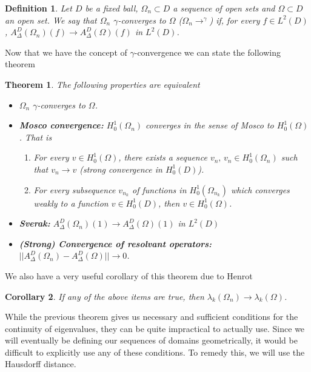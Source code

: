 \documentclass[12pt]{report}
\newtheorem{theorem}{Theorem}[section]
\newtheorem{corollary}[theorem]{Corollary}
\newtheorem{definition}{Definition}
\numberwithin{definition}{section}
\begin{document}
\begin{definition}
  Let $D$ be a fixed ball, $\Omega_{n} \subset D$ a sequence of open sets and $\Omega \subset D$ an open set.
  We say that $\Omega_{n}$ $\gamma$-converges to $\Omega$ ($\Omega_{n} \to^{\gamma}$) if, for every $f \in L^{2}(D)$, $A_{\Delta}^{D}(\Omega_{n})(f) \to A_{\Delta}^{D}(\Omega)(f)$ in $L^{2}(D)$.
\end{definition}

Now that we have the concept of $\gamma$-convergence we can state the following theorem\cite{convergence}

\begin{theorem}
  The following properties are equivalent
  \begin{itemize}
    \item $\Omega_{n}$ $\gamma$-converges to $\Omega$.
    \item \textbf{Mosco convergence:} $H_{0}^{1}(\Omega_{n})$ converges in the sense of Mosco to $H_{0}^{1}(\Omega)$.
      That is
      \begin{enumerate}
        \item[(M1)] For every $v \in H_{0}^{1}(\Omega)$, there exists a sequence $v_{n}, \, v_{n} \in H_{0}^{1}(\Omega_{n})$ such that $v_{n} \to v$ (strong convergence in $H_{0}^{1}(D)$).
        \item[(M2)] For every subsequence $v_{n_{k}}$ of functions in $H_{0}^{1}(\Omega_{n_{k}})$ which converges weakly to a function $v \in H_{0}^{1}(D)$, then $v \in H_{0}^{1}(\Omega)$.
      \end{enumerate}
    \item \textbf{Sverak:} $A_{\Delta}^{D}(\Omega_{n})(1) \to A_{\Delta}^{D}(\Omega)(1)$ in $L^{2}(D)$
    \item \textbf{(Strong) Convergence of resolvant operators:} $|| A_{\Delta}^{D}(\Omega_{n}) - A_{\Delta}^{D}(\Omega) || \to 0$.
  \end{itemize}
\end{theorem}

We also have a very useful corollary of this theorem due to Henrot\cite{henrot}

\begin{corollary}
  If any of the above items are true, then $\lambda_{k}(\Omega_{n}) \to \lambda_{k}(\Omega)$.
\end{corollary}

While the previous theorem gives us necessary and sufficient conditions for the continuity of eigenvalues, they can be quite impractical to actually use.
Since we will eventually be defining our sequences of domains geometrically, it would be difficult to explicitly use any of these conditions.
To remedy this, we will use the Hausdorff distance.
\end{document}

